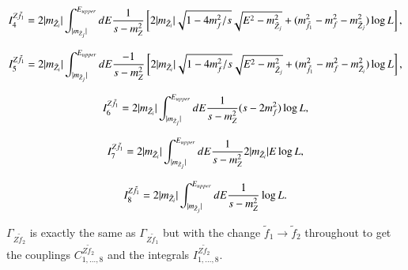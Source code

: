 \documentclass[final,3p,times]{elsarticle}
\begin{document}
\begin{equation}
I_{4}^{Z \tilde{f}_1} = 2|m_{\tilde{Z}_i}|\int_{|m_{\tilde{Z}_j}|}^{E_{upper}} dE {1 \over s-m_{Z}^2}
\left[2|m_{\tilde{Z}_i}|\sqrt{1-4m_{f}^2/s}\sqrt{E^2 - m_{\tilde{Z}_j}^2} + (m_{\tilde{f}_1}^2 - m_{f}^2 -m_{\tilde{Z}_j}^2) \log L\right],
\end{equation}

\begin{equation}
I_{5}^{Z \tilde{f}_1} = 2|m_{\tilde{Z}_i}|\int_{|m_{\tilde{Z}_j}|}^{E_{upper}} dE {-1 \over s-m_{Z}^2}
\left[2|m_{\tilde{Z}_i}|\sqrt{1-4m_{f}^2/s}\sqrt{E^2 - m_{\tilde{Z}_j}^2} + (m_{\tilde{f}_1}^2 - m_{f}^2 -m_{\tilde{Z}_i}^2) \log L\right],
\end{equation}

\begin{equation}
I_{6}^{Z \tilde{f}_1} = 2|m_{\tilde{Z}_i}|\int_{|m_{\tilde{Z}_j}|}^{E_{upper}} dE {1 \over s-m_{Z}^2}(s - 2m_{f}^2)\log L,
\end{equation}

\begin{equation}
I_{7}^{Z \tilde{f}_1} = 2|m_{\tilde{Z}_i}|\int_{|m_{\tilde{Z}_j}|}^{E_{upper}} dE {1 \over s-m_{Z}^2} 2|m_{\tilde{Z}_i}| E \log L,
\end{equation}

\begin{equation}
I_{8}^{Z \tilde{f}_1} = 2|m_{\tilde{Z}_i}|\int_{|m_{\tilde{Z}_j}|}^{E_{upper}} dE {1 \over s-m_{Z}^2} \log L.
\end{equation}

$\Gamma_{Z \tilde{f}_2}$ is exactly the same as $\Gamma_{Z \tilde{f}_1}$ but with the change $\tilde{f}_1 \rightarrow \tilde{f}_2$ throughout to get the couplings $C_{1,\ldots,8}^{Z \tilde{f}_2}$ and the integrals $I_{1,\ldots,8}^{Z \tilde{f}_2}$.
\end{document}
